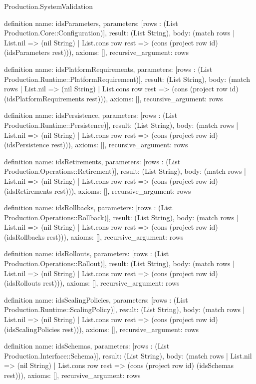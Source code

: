 \begin{lexlean}{Production.SystemValidation}
\begin{semanticmodule}
definition{
  name: idsParameters,
  parameters: [rows : (List Production.Core::Configuration)],
  result: (List String),
  body: (match rows
    | List.nil => (nil String)
    | List.cons row rest => (cons (project row id) (idsParameters rest))),
  axioms: [],
  recursive_argument: rows
}

definition{
  name: idsPlatformRequirements,
  parameters: [rows : (List Production.Runtime::PlatformRequirement)],
  result: (List String),
  body: (match rows
    | List.nil => (nil String)
    | List.cons row rest => (cons (project row id) (idsPlatformRequirements rest))),
  axioms: [],
  recursive_argument: rows
}

definition{
  name: idsPersistence,
  parameters: [rows : (List Production.Runtime::Persistence)],
  result: (List String),
  body: (match rows
    | List.nil => (nil String)
    | List.cons row rest => (cons (project row id) (idsPersistence rest))),
  axioms: [],
  recursive_argument: rows
}

definition{
  name: idsRetirements,
  parameters: [rows : (List Production.Operations::Retirement)],
  result: (List String),
  body: (match rows
    | List.nil => (nil String)
    | List.cons row rest => (cons (project row id) (idsRetirements rest))),
  axioms: [],
  recursive_argument: rows
}

definition{
  name: idsRollbacks,
  parameters: [rows : (List Production.Operations::Rollback)],
  result: (List String),
  body: (match rows
    | List.nil => (nil String)
    | List.cons row rest => (cons (project row id) (idsRollbacks rest))),
  axioms: [],
  recursive_argument: rows
}

definition{
  name: idsRollouts,
  parameters: [rows : (List Production.Operations::Rollout)],
  result: (List String),
  body: (match rows
    | List.nil => (nil String)
    | List.cons row rest => (cons (project row id) (idsRollouts rest))),
  axioms: [],
  recursive_argument: rows
}

definition{
  name: idsScalingPolicies,
  parameters: [rows : (List Production.Runtime::ScalingPolicy)],
  result: (List String),
  body: (match rows
    | List.nil => (nil String)
    | List.cons row rest => (cons (project row id) (idsScalingPolicies rest))),
  axioms: [],
  recursive_argument: rows
}

definition{
  name: idsSchemas,
  parameters: [rows : (List Production.Interface::Schema)],
  result: (List String),
  body: (match rows
    | List.nil => (nil String)
    | List.cons row rest => (cons (project row id) (idsSchemas rest))),
  axioms: [],
  recursive_argument: rows
}


\end{semanticmodule}
\end{lexlean}
